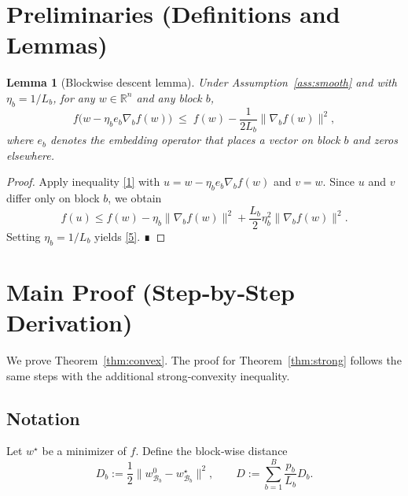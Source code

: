 \documentclass[11pt]{article}
\newtheorem{lemma}{Lemma}
\newcommand{\R}{\mathbb{R}}
\begin{document}
\section*{Preliminaries (Definitions and Lemmas)}
\begin{lemma}[Blockwise descent lemma]\label{lem:descent}
Under Assumption~\ref{ass:smooth} and with $\eta_{b}=1/L_{b}$,
for any $w\in\R^{n}$ and any block $b$,
\[
f\!\bigl(w-\eta_{b}e_{b}\nabla_{b}f(w)\bigr)
\;\le\;
f(w)-\frac{1}{2L_{b}}\|\nabla_{b}f(w)\|^{2},
\tag{5}
\]
where $e_{b}$ denotes the embedding operator that places a vector on block $b$
and zeros elsewhere.
\end{lemma}
\begin{proof}
Apply inequality \eqref{1} with $u=w-\eta_{b}e_{b}\nabla_{b}f(w)$ and $v=w$.
Since $u$ and $v$ differ only on block $b$, we obtain
\[
f(u)\le f(w)-\eta_{b}\|\nabla_{b}f(w)\|^{2}
+\frac{L_{b}}{2}\eta_{b}^{2}\|\nabla_{b}f(w)\|^{2}.
\]
Setting $\eta_{b}=1/L_{b}$ yields \eqref{5}.  ∎
\end{proof}

\section*{Main Proof (Step‑by‑Step Derivation)}
We prove Theorem~\ref{thm:convex}.  The proof for Theorem~\ref{thm:strong}
follows the same steps with the additional strong‑convexity inequality.

\subsection*{Notation}
Let $w^{\star}$ be a minimizer of $f$.  Define the block‑wise distance
\[
D_{b}:=\frac12\|w^{0}_{\mathcal{B}_{b}}-w^{\star}_{\mathcal{B}_{b}}\|^{2},\qquad
D:=\sum_{b=1}^{B}\frac{p_{b}}{L_{b}}D_{b}.
\]
\end{document}

